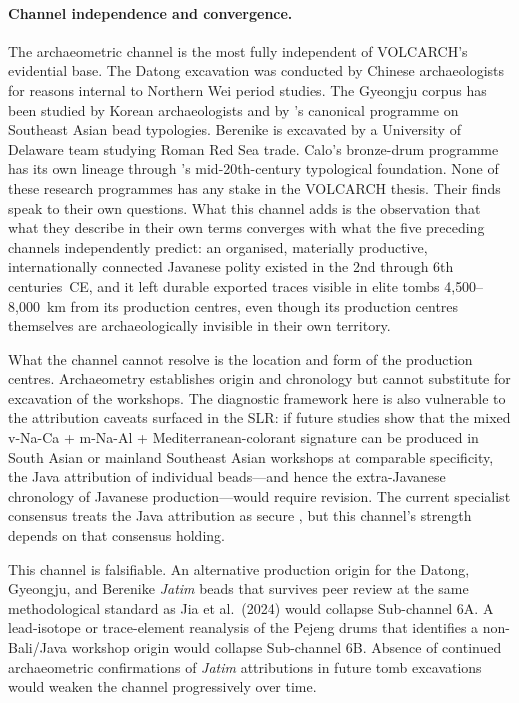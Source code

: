 \documentclass[12pt,a4paper]{article}
\begin{document}
\paragraph{Channel independence and convergence.} The archaeometric channel is the most fully independent of VOLCARCH's evidential base. The Datong excavation was conducted by Chinese archaeologists for reasons internal to Northern Wei period studies. The Gyeongju corpus has been studied by Korean archaeologists and by \citeauthor{lankton2008}'s canonical programme on Southeast Asian bead typologies. Berenike is excavated by a University of Delaware team studying Roman Red Sea trade. Calo's bronze-drum programme has its own lineage through \citeauthor{bernetkempers1988}'s mid-20th-century typological foundation. None of these research programmes has any stake in the VOLCARCH thesis. Their finds speak to their own questions. What this channel adds is the observation that what they describe in their own terms converges with what the five preceding channels independently predict: an organised, materially productive, internationally connected Javanese polity existed in the 2nd through 6th centuries~CE, and it left durable exported traces visible in elite tombs 4{,}500--8{,}000~km from its production centres, even though its production centres themselves are archaeologically invisible in their own territory.

What the channel cannot resolve is the location and form of the production centres. Archaeometry establishes origin and chronology but cannot substitute for excavation of the workshops. The diagnostic framework here is also vulnerable to the attribution caveats surfaced in the SLR: if future studies show that the mixed v-Na-Ca + m-Na-Al + Mediterranean-colorant signature can be produced in South Asian or mainland Southeast Asian workshops at comparable specificity, the Java attribution of individual beads---and hence the extra-Javanese chronology of Javanese production---would require revision. The current specialist consensus treats the Java attribution as secure \citep{lankton2008,jia_etal_2024}, but this channel's strength depends on that consensus holding.

This channel is falsifiable. An alternative production origin for the Datong, Gyeongju, and Berenike \textit{Jatim} beads that survives peer review at the same methodological standard as Jia et al.\ (2024) would collapse Sub-channel 6A. A lead-isotope or trace-element reanalysis of the Pejeng drums that identifies a non-Bali/Java workshop origin would collapse Sub-channel 6B. Absence of continued archaeometric confirmations of \textit{Jatim} attributions in future tomb excavations would weaken the channel progressively over time.
\end{document}

